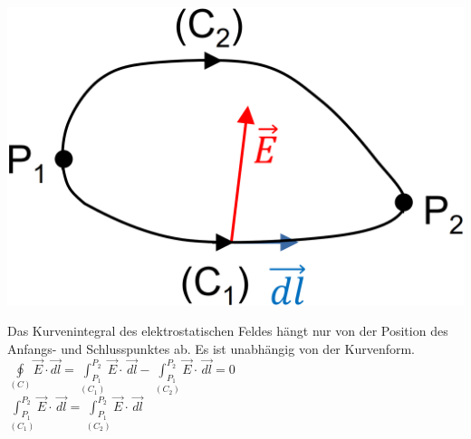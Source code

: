 \begin{minipage}[c]{0.36\columnwidth}
    \includegraphics[width=\columnwidth]{images/V1B2.png}
\end{minipage}
\hfill
\begin{minipage}[c]{0.60\columnwidth}
Das Kurvenintegral des elektrostatischen Feldes hängt nur von der Position des Anfangs- und 
    Schlusspunktes ab. Es ist unabhängig von der 
    Kurvenform.\\
     
    $\underset{(C)}{\operatorname*{\oint}} \vec{E} \cdot\vec{dl} = \underset{(C_1)}{\operatorname*\int_{P_1}^{P_2}} \vec{E} \cdot \,\vec{dl} - \underset{(C_2)}{\operatorname*\int_{P_1}^{P_2}} \vec{E} \cdot \,\vec{dl} =0$\\
    $\underset{(C_1)}{\operatorname*\int_{P_1}^{P_2}} \vec{E} \cdot \,\vec{dl} = \underset{(C_2)}{\operatorname*\int_{P_1}^{P_2}} \vec{E} \cdot \,\vec{dl}$
\end{minipage}

